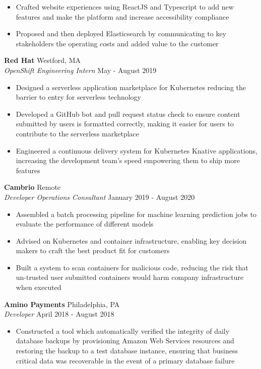 \documentclass[10pt]{article}
\begin{document}
\begin{flushleft}
\begin{itemize}
		\item Crafted website experiences using ReactJS and Typescript to add new features and make the platform and increase accessibility compliance

        \item Proposed and then deployed Elasticsearch by communicating to key stakeholders the operating costs and added value to the customer
    \end{itemize}
    
	\textbf{Red Hat} \hfill Westford, MA \\
	\textit{OpenShift Engineering Intern} \hfill May - August 2019 \\
	\begin{itemize}
       	\item Designed a serverless application marketplace for Kubernetes reducing the barrier to entry for serverless technology
		\item Developed a GitHub bot and pull request status check to ensure content submitted by users is formatted
               correctly, making it easier for users to contribute to the serverless marketplace
		\item Engineered a continuous delivery system for Kubernetes Knative applications, increasing the development
               team's speed empowering them to ship more features
	\end{itemize}
     
	\textbf{Cambrio} \hfill Remote \\
	\textit{Developer Operations Consultant} \hfill January 2019 - August 2020  \\
	\begin{itemize}
		\item Assembled a batch processing pipeline for machine learning prediction jobs to evaluate the 
			performance of different models
		\item Advised on Kubernetes and container infrastructure, enabling key decision makers to craft the best product fit for customers
		\item Built a system to scan containers for malicious code, reducing the risk that un-trusted user submitted containers would harm company infrastructure when executed
	\end{itemize}

	\textbf{Amino Payments} \hfill Philadelphia, PA \\
	\textit{Developer} \hfill April 2018 - August 2018 \\
	\begin{itemize}
		\item Constructed a tool which automatically verified the integrity of daily database backups by provisioning
			Amazon Web Services resources and restoring the backup to a test database instance, ensuring that business 
			critical data was recoverable in the event of a primary database failure


\end{itemize}
\end{flushleft}
\end{document}
